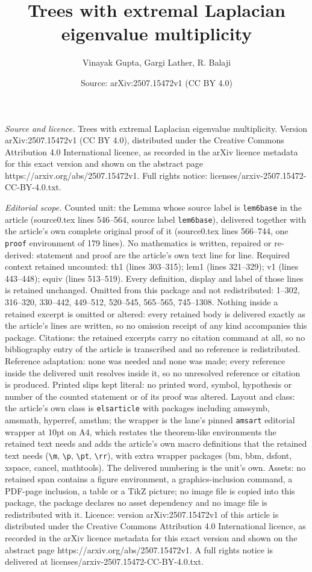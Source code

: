 \documentclass[10pt,a4paper]{amsart}
\title[Trees with extremal Laplacian eigenvalue multiplicity]{Trees with extremal Laplacian eigenvalue multiplicity}
\author{Vinayak Gupta, Gargi Lather, R. Balaji}
\date{Source: arXiv:2507.15472v1 (CC BY 4.0)}
\begin{document}
\maketitle

\noindent\emph{Source and licence.} Trees with extremal Laplacian eigenvalue multiplicity. Version arXiv:2507.15472v1 (CC BY 4.0), distributed under the Creative Commons Attribution 4.0 International licence, as recorded in the arXiv licence metadata for this exact version and shown on the abstract page https://arxiv.org/abs/2507.15472v1. Full rights notice: licenses/arxiv-2507.15472-CC-BY-4.0.txt.\par\smallskip

\noindent\textit{Editorial scope.} Counted unit: the Lemma whose source label is \texttt{lem6base} in the article (source0.tex lines 546--564, source label \texttt{lem6base}), delivered together with the article's own complete original proof of it (source0.tex lines 566--744, one \texttt{proof} environment of 179 lines). No mathematics is written, repaired or re-derived: statement and proof are the article's own text line for line. Required context retained uncounted: th1 (lines 303--315); lem1 (lines 321--329); v1 (lines 443--448); equiv (lines 513--519). Every definition, display and label of those lines is retained unchanged. Omitted from this package and not redistributed: 1--302, 316--320, 330--442, 449--512, 520--545, 565--565, 745--1308. Nothing inside a retained excerpt is omitted or altered: every retained body is delivered exactly as the article's lines are written, so no omission receipt of any kind accompanies this package. Citations: the retained excerpts carry no citation command at all, so no bibliography entry of the article is transcribed and no reference is redistributed. Reference adaptation: none was needed and none was made; every reference inside the delivered unit resolves inside it, so no unresolved reference or citation is produced. Printed slips kept literal: no printed word, symbol, hypothesis or number of the counted statement or of its proof was altered. Layout and class: the article's own class is \texttt{elsarticle} with packages including amssymb, amsmath, hyperref, amsthm; the wrapper is the lane's pinned \texttt{amsart} editorial wrapper at 10pt on A4, which restates the theorem-like environments the retained text needs and adds the article's own macro definitions that the retained text needs (\texttt{\textbackslash m}, \texttt{\textbackslash p}, \texttt{\textbackslash pt}, \texttt{\textbackslash rr}), with extra wrapper packages (bm, bbm, dsfont, xspace, cancel, mathtools). The delivered numbering is the unit's own. Assets: no retained span contains a figure environment, a graphics-inclusion command, a PDF-page inclusion, a table or a TikZ picture; no image file is copied into this package, the package declares no asset dependency and no image file is redistributed with it. Licence: version arXiv:2507.15472v1 of this article is distributed under the Creative Commons Attribution 4.0 International licence, as recorded in the arXiv licence metadata for this exact version and shown on the abstract page https://arxiv.org/abs/2507.15472v1. A full rights notice is delivered at licenses/arxiv-2507.15472-CC-BY-4.0.txt. 
\end{document}
